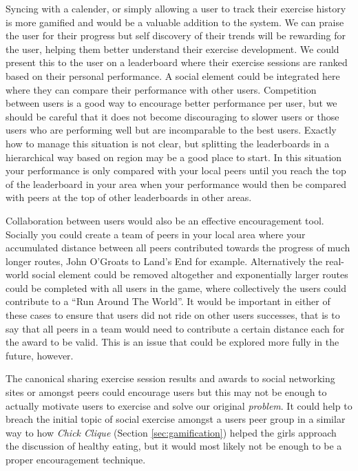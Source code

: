 Syncing with a calender, or simply allowing a user to track their
exercise history is more gamified and would be a valuable addition to
the system. We can praise the user for their progress but self
discovery of their trends will be rewarding for the user, helping them
better understand their exercise development. We could present this to
the user on a leaderboard where their exercise sessions are ranked
based on their personal performance. A social element could be
integrated here where they can compare their performance with other
users. Competition between users is a good way to encourage better
performance per user, but we should be careful that it does not become
discouraging to slower users or those users who are performing well
but are incomparable to the best users. Exactly how to manage this
situation is not clear, but splitting the leaderboards in a
hierarchical way based on region may be a good place to start. In this
situation your performance is only compared with your local peers
until you reach the top of the leaderboard in your area when your
performance would then be compared with peers at the top of other
leaderboards in other areas. 

Collaboration between users would also be an effective encouragement
tool. Socially you could create a team of peers in your local area
where your accumulated distance between all peers contributed towards
the progress of much longer routes, John O'Groats  to Land's End for
example. Alternatively the real-world social element could be removed
altogether and exponentially larger routes could be completed with all
users in the game, where collectively the users could contribute to a
``Run Around The World''. It would be important in either of these
cases to ensure that users did not ride on other users successes, that
is to say that all peers in a team would need to contribute a
certain distance each for the award to be valid. This is an issue that
could be explored more fully in the future, however.

The canonical sharing exercise session results and awards to social
networking sites or amongst peers could encourage users but this may
not be enough to actually motivate users to exercise and solve our
original \emph{problem}. It could help to breach the initial topic of
social exercise amongst a users peer group in a similar way to how
\emph{Chick Clique} (Section \ref{sec:gamification}) helped the girls
approach the discussion of healthy eating, but it would most likely
not be enough to be a proper encouragement technique. 

